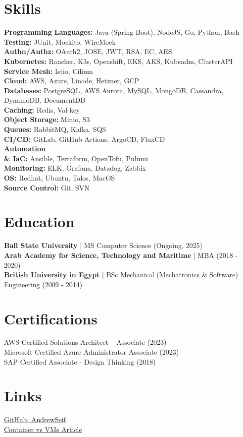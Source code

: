 \documentclass{resume} %
\begin{document}
\section{Skills}
\textbf{Programming Languages:} Java (Spring Boot), NodeJS, Go, Python, Bash\\
\textbf{Testing:} JUnit, Mockito, WireMock\\
\textbf{Authn/Authz:} OAuth2, JOSE, JWT, RSA, EC, AES\\
\textbf{Kubernetes:} Rancher, K3s, Openshift, EKS, AKS, Kubeadm, ClusterAPI\\
\textbf{Service Mesh:} Istio, Cilium\\
\textbf{Cloud:} AWS, Azure, Linode, Hetzner, GCP\\
\textbf{Databases:} PostgreSQL, AWS Aurora, MySQL, MongoDB, Cassandra, DynamoDB, DocumentDB\\
\textbf{Caching:} Redis, Val-key\\
\textbf{Object Storage:} Minio, S3\\
\textbf{Queues:} RabbitMQ, Kafka, SQS\\
\textbf{CI/CD:} GitLab, GitHub Actions, ArgoCD, FluxCD\\
\textbf{Automation \\& IaC:} Ansible, Terraform, OpenTofu, Pulumi\\
\textbf{Monitoring:} ELK, Grafana, Datadog, Zabbix\\
\textbf{OS:} Redhat, Ubuntu, Talos, MacOS\\
\textbf{Source Control:} Git, SVN

\section{Education}
\textbf{Ball State University} | MS Computer Science (Ongoing, 2025)\\
\textbf{Arab Academy for Science, Technology and Maritime} | MBA (2018 - 2020)\\
\textbf{British University in Egypt} | BSc Mechanical (Mechatronics & Software) Engineering (2009 - 2014)

\section{Certifications}
AWS Certified Solutions Architect – Associate (2023)\\
Microsoft Certified Azure Administrator Associate (2023)\\
SAP Certified Associate - Design Thinking (2018)

\section{Links}
\href{https://github.com/AndrewSeif}{GitHub: AndrewSeif}\\
\href{https://andrewseif.github.io/Container-vs-VMs/}{Container vs VMs Article}
\end{document}
